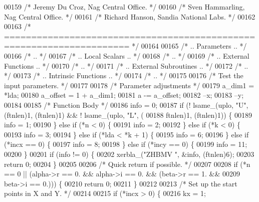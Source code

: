 \begin{DoxyCode}
00159 \textcolor{comment}{/*     Jeremy Du Croz, Nag Central Office. */}
00160 \textcolor{comment}{/*     Sven Hammarling, Nag Central Office. */}
00161 \textcolor{comment}{/*     Richard Hanson, Sandia National Labs. */}
00162 
00163 \textcolor{comment}{/*  ===================================================================== */}
00164 
00165 \textcolor{comment}{/*     .. Parameters .. */}
00166 \textcolor{comment}{/*     .. */}
00167 \textcolor{comment}{/*     .. Local Scalars .. */}
00168 \textcolor{comment}{/*     .. */}
00169 \textcolor{comment}{/*     .. External Functions .. */}
00170 \textcolor{comment}{/*     .. */}
00171 \textcolor{comment}{/*     .. External Subroutines .. */}
00172 \textcolor{comment}{/*     .. */}
00173 \textcolor{comment}{/*     .. Intrinsic Functions .. */}
00174 \textcolor{comment}{/*     .. */}
00175 
00176 \textcolor{comment}{/*     Test the input parameters. */}
00177 
00178     \textcolor{comment}{/* Parameter adjustments */}
00179     a\_dim1 = *lda;
00180     a\_offset = 1 + a\_dim1;
00181     a -= a\_offset;
00182     --x;
00183     --y;
00184 
00185     \textcolor{comment}{/* Function Body */}
00186     info = 0;
00187     \textcolor{keywordflow}{if} (! lsame\_(uplo, \textcolor{stringliteral}{"U"}, (ftnlen)1, (ftnlen)1) && ! lsame\_(uplo, \textcolor{stringliteral}{"L"}, (
00188         ftnlen)1, (ftnlen)1)) \{
00189     info = 1;
00190     \} \textcolor{keywordflow}{else} \textcolor{keywordflow}{if} (*n < 0) \{
00191     info = 2;
00192     \} \textcolor{keywordflow}{else} \textcolor{keywordflow}{if} (*k < 0) \{
00193     info = 3;
00194     \} \textcolor{keywordflow}{else} \textcolor{keywordflow}{if} (*lda < *k + 1) \{
00195     info = 6;
00196     \} \textcolor{keywordflow}{else} \textcolor{keywordflow}{if} (*incx == 0) \{
00197     info = 8;
00198     \} \textcolor{keywordflow}{else} \textcolor{keywordflow}{if} (*incy == 0) \{
00199     info = 11;
00200     \}
00201     \textcolor{keywordflow}{if} (info != 0) \{
00202     xerbla\_(\textcolor{stringliteral}{"ZHBMV "}, &info, (ftnlen)6);
00203     \textcolor{keywordflow}{return} 0;
00204     \}
00205 
00206 \textcolor{comment}{/*     Quick return if possible. */}
00207 
00208     \textcolor{keywordflow}{if} (*n == 0 || (alpha->r == 0. && alpha->i == 0. && (beta->r == 1. && 
00209                                                          beta->i == 0.))) \{
00210     \textcolor{keywordflow}{return} 0;
00211     \}
00212 
00213 \textcolor{comment}{/*     Set up the start points in  X  and  Y. */}
00214 
00215     \textcolor{keywordflow}{if} (*incx > 0) \{
00216     kx = 1;

\end{DoxyCode}
